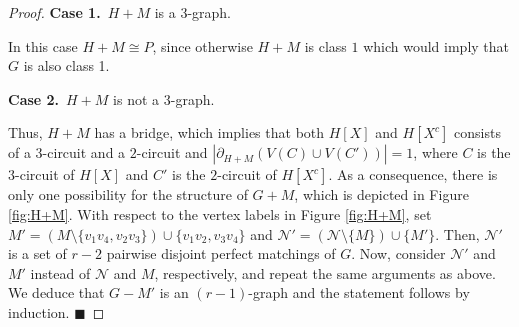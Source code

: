 \documentclass[a4paper,11pt]{article}
\newcommand{\ca}{\mathcal}
\theoremstyle{remark}
\newcommand{\ENDproof}{\hfill $\blacksquare$\medskip\par}
\begin{document}
\begin{proof}
{\bf Case 1.}\ $H+M$ is a $3$-graph.
	
In this case $H+M \cong P$, since otherwise $H+M$ is class $1$ which would imply that $G$ is also class 1.

{\bf Case 2.}\ $H+M$ is not a $3$-graph.
	
Thus, $H+M$ has a bridge, which implies that both $H[X]$ and $H[X^c]$ consists of  a $3$-circuit and a $2$-circuit and $|\partial_{H+M}(V(C) \cup V(C'))| =  1$, where $C$ is the $3$-circuit of $H[X]$ and $C'$ is the $2$-circuit of $H[X^c]$. As a consequence, there is only one possibility for the structure of $G+M$, which is depicted in Figure \ref{fig:H+M}. With respect to the vertex labels in Figure \ref{fig:H+M}, set $M'=\left(M\setminus \{v_1v_4, v_2v_3\}\right)\cup \{v_1v_2, v_3v_4\}$ and $\ca N' = \left( \ca N \setminus \{M\} \right) \cup \{M'\}$. Then, $\ca N'$ is a set of $r-2$ pairwise disjoint perfect matchings of $G$. Now, consider $\ca N'$ and $M'$ instead of $\ca N$ and $M$, respectively, and repeat the same arguments as above. We deduce that $G-M'$ is an $(r-1)$-graph and the statement follows by induction.
\ENDproof



\end{proof}
\end{document}

